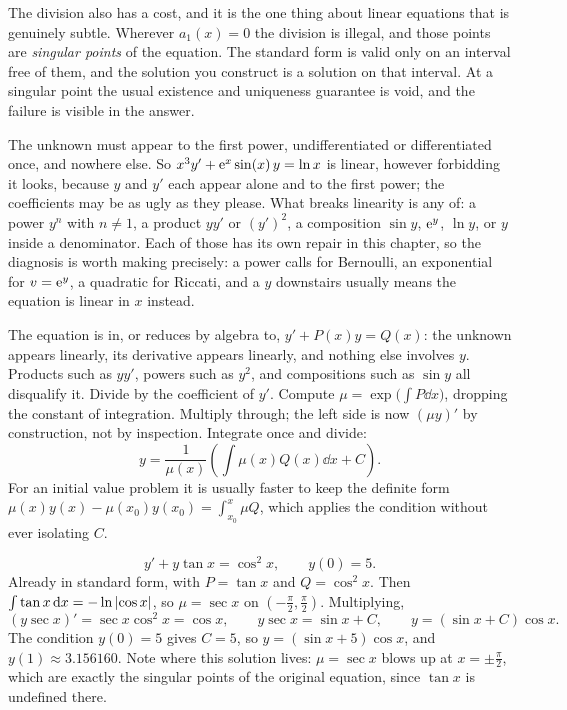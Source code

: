 The division also has a cost, and it is the one thing about linear equations that is genuinely subtle. Wherever $a_1(x)=0$ the division is illegal, and those points are \emph{singular points} of the equation. The standard form is valid only on an interval free of them, and the solution you construct is a solution on that interval. At a singular point the usual existence and uniqueness guarantee is void, and the failure is visible in the answer.

\begin{keynote}
The unknown must appear to the first power, undifferentiated or differentiated once, and nowhere else. So $x^{3}y'+\mathrm{e}^{x}\sin(x)\,y=\ln x$ is linear, however forbidding it looks, because $y$ and $y'$ each appear alone and to the first power; the coefficients may be as ugly as they please. What breaks linearity is any of: a power $y^{n}$ with $n\neq1$, a product $yy'$ or $(y')^{2}$, a composition $\sin y$, $\mathrm{e}^{y}$, $\ln y$, or $y$ inside a denominator. Each of those has its own repair in this chapter, so the diagnosis is worth making precisely: a power calls for Bernoulli, an exponential for $v=\mathrm{e}^{y}$, a quadratic for Riccati, and a $y$ downstairs usually means the equation is linear in $x$ instead.
\end{keynote}

\cue The equation is in, or reduces by algebra to, $y'+P(x)y=Q(x)$: the unknown appears linearly, its derivative appears linearly, and nothing else involves $y$. Products such as $yy'$, powers such as $y^{2}$, and compositions such as $\sin y$ all disqualify it.
\method Divide by the coefficient of $y'$. Compute $\mu=\exp\bigl(\int P\dd x\bigr)$, dropping the constant of integration. Multiply through; the left side is now $(\mu y)'$ by construction, not by inspection. Integrate once and divide:
\[y=\frac{1}{\mu(x)}\left(\int\mu(x)Q(x)\dd x+C\right).\]
For an initial value problem it is usually faster to keep the definite form $\mu(x)y(x)-\mu(x_0)y(x_0)=\int_{x_0}^{x}\mu Q$, which applies the condition without ever isolating $C$.

\begin{worked}
\[y'+y\tan x=\cos^{2}x,\qquad y(0)=5.\]
Already in standard form, with $P=\tan x$ and $Q=\cos^{2}x$. Then $\int\tan x\,\mathrm{d} x=-\ln\left\lvert \cos x\right\rvert$, so $\mu=\sec x$ on $(-\tfrac{\pi}{2},\tfrac{\pi}{2})$. Multiplying,
\[(y\sec x)'=\sec x\cos^{2}x=\cos x,\qquad y\sec x=\sin x+C,\qquad y=(\sin x+C)\cos x.\]
The condition $y(0)=5$ gives $C=5$, so $y=(\sin x+5)\cos x$, and $y(1)\approx3.156160$. Note where this solution lives: $\mu=\sec x$ blows up at $x=\pm\tfrac{\pi}{2}$, which are exactly the singular points of the original equation, since $\tan x$ is undefined there.
\end{worked}

